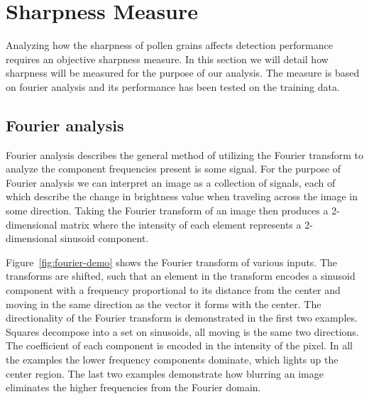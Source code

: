 
\section{Sharpness Measure}\label{sec:method-sharpness}
Analyzing how the sharpness of pollen grains affects detection performance requires an objective sharpness measure.
In this section we will detail how sharpness will be measured for the purpose of our analysis.
The measure is based on fourier analysis and its performance has been tested on the training data.

\subsection{Fourier analysis}
Fourier analysis describes the general method of utilizing the Fourier transform to analyze the component frequencies present is some signal.
For the purpose of Fourier analysis we can interpret an image as a collection of signals, each of which describe the change in brightness value when traveling across the image in some direction.
Taking the Fourier transform of an image then produces a 2-dimensional matrix where the intensity of each element represents a 2-dimensional sinusoid component.

Figure~\ref{fig:fourier-demo} shows the Fourier transform of various inputs.
The transforms are shifted, such that an element in the transform encodes a sinusoid component with a frequency proportional to its distance from the center and moving in the same direction as the vector it forms with the center. 
The directionality of the Fourier transform is demonstrated in the first two examples.
Squares decompose into a set on sinusoids, all moving is the same two directions.
The coefficient of each component is encoded in the intensity of the pixel.
In all the examples the lower frequency components dominate, which lights up the center region. The last two examples demonstrate how blurring an image eliminates the higher frequencies from the Fourier domain.



